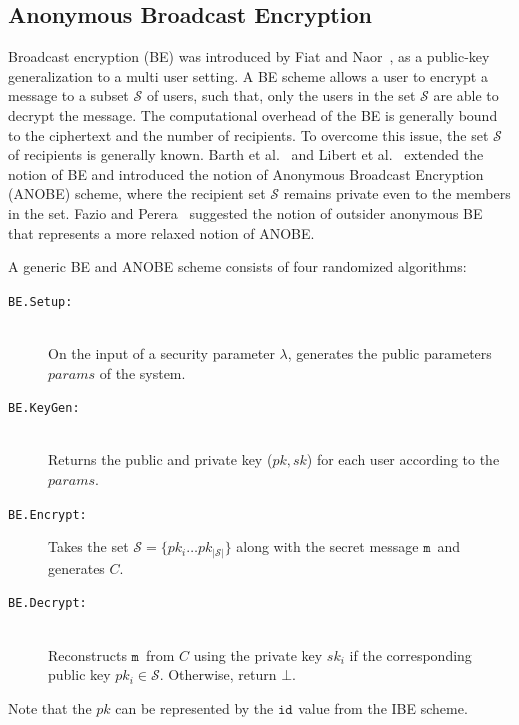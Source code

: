 \documentclass[journal]{IEEEtran}
\newcommand{\msg}{\ensuremath{\mathtt{m}}}
\newcommand{\id}[1]{\ensuremath{\mathtt{id}_{#1}}}
\begin{document}
\subsection{Anonymous Broadcast Encryption}
Broadcast encryption (BE) was introduced by Fiat and Naor~\cite{FiatBE}, as a public-key generalization to a multi user setting. A BE scheme allows a user to encrypt a message to a subset $\mathcal{S}$ of users, such that, only the users in the set $\mathcal{S}$ are able to decrypt the message. The computational overhead of the BE is generally bound to the ciphertext and the number of recipients. To overcome this issue, the set $\mathcal{S}$ of recipients is generally known. Barth et al.~\cite{BarthBonehWaters} and Libert et al.~\cite{LibertANOBE} extended the notion of BE and introduced the notion of Anonymous Broadcast Encryption (ANOBE) scheme, where the recipient set $\mathcal{S}$ remains private even to the members in the set. Fazio and Perera~\cite{FazioOutsiderANOBE} suggested the notion of outsider anonymous BE that represents a more relaxed notion of ANOBE.  

A generic BE and ANOBE scheme consists of four randomized algorithms:
\begin{description}
    \item[\texttt{BE.Setup:}]~\\ On the input of a security parameter $\lambda$, generates the public parameters $params$ of the system.
    \item[\texttt{BE.KeyGen:}]~\\ Returns the public and private key ($pk,sk$) for each user according to the $params$.
    \item[\texttt{BE.Encrypt:}] Takes the set $\mathcal{S}=\{pk_i \ldots pk_{|\mathcal{S}|}\}$ along with the secret message \msg\ and generates $C$.
    \item[\texttt{BE.Decrypt:}]~\\ Reconstructs \msg\ from $C$ using the private key $sk_i$ if the corresponding public key $pk_i \in \mathcal{S}$. Otherwise, return $\bot$.
\end{description}

Note that the $pk$ can be represented by the \id{} value from the IBE scheme. 
\end{document}

